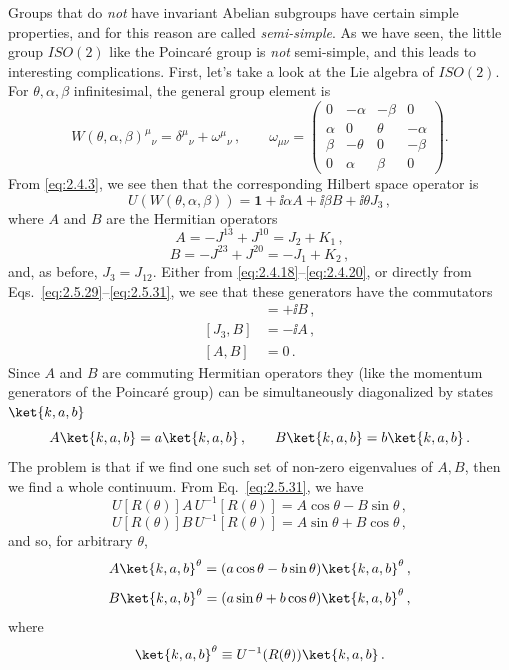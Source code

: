 Groups that do \emph{not} have invariant Abelian subgroups have certain simple
properties, and for this reason are called \emph{semi-simple}. As we have seen,
the little group $ISO(2)$ like the Poincar\'e group is \emph{not}
semi-simple, and this leads to interesting complications. First, let's take a
look at the Lie algebra of $ISO(2)$. For $\theta,\alpha,\beta$ infinitesimal,
the general group element is
\[
W(\theta,\alpha,\beta)^\mu{}_{\nu}
=\delta^\mu{}_{\nu}+\omega^\mu{}_{\nu}\,,
\qquad
\omega_{\mu\nu}=
\begin{pmatrix}
0&-\alpha&-\beta&0\\
\alpha&0&\theta&-\alpha\\
\beta&-\theta&0&-\beta\\
0&\alpha&\beta&0
\end{pmatrix}.
\]
From \eqref{eq:2.4.3}, we see then that the corresponding Hilbert space operator is
\begin{equation}
U(W(\theta,\alpha,\beta))=\mathbf{1}+\ii\alpha A+\ii\beta B+\ii\theta J_3\,,
\tag{2.5.32}\label{eq:2.5.32}
\end{equation}
where $A$ and $B$ are the Hermitian operators
\begin{equation}
A=-J^{13}+J^{10}=J_2+K_1\,,
\tag{2.5.33}\label{eq:2.5.33}
\end{equation}
\begin{equation}
B=-J^{23}+J^{20}=-J_1+K_2\,,
\tag{2.5.34}\label{eq:2.5.34}
\end{equation}
and, as before, $J_3=J_{12}$. Either from \eqref{eq:2.4.18}--\eqref{eq:2.4.20}, or directly from
Eqs.~\eqref{eq:2.5.29}--\eqref{eq:2.5.31}, we see that these generators have the commutators
\begin{align}
[J_3,A]&=+\ii B\,, \tag{2.5.35}\label{eq:2.5.35}\\
[J_3,B]&=-\ii A\,, \tag{2.5.36}\label{eq:2.5.36}\\
[A,B]&=0\,. \tag{2.5.37}\label{eq:2.5.37}
\end{align}
Since $A$ and $B$ are commuting Hermitian operators they (like the momentum
generators of the Poincar\'e group) can be simultaneously
diagonalized by states $\ket{k,a,b}$
\[
A\ket{k,a,b}=a\ket{k,a,b}\,,
\qquad
B\ket{k,a,b}=b\ket{k,a,b}\,.
\]
The problem is that if we find one such set of non-zero eigenvalues of $A,B$,
then we find a whole continuum. From Eq.~\eqref{eq:2.5.31}, we have
\[
U[R(\theta)]A\,U^{-1}[R(\theta)]=A\cos\theta-B\sin\theta\,,
\]
\[
U[R(\theta)]B\,U^{-1}[R(\theta)]=A\sin\theta+B\cos\theta\,,
\]
and so, for arbitrary $\theta$,
\[
A\ket{k,a,b}^{\theta}=(a\cos\theta-b\sin\theta)\ket{k,a,b}^{\theta}\,,
\]
\[
B\ket{k,a,b}^{\theta}=(a\sin\theta+b\cos\theta)\ket{k,a,b}^{\theta}\,,
\]
where
\[
\ket{k,a,b}^{\theta}\equiv U^{-1}(R(\theta))\ket{k,a,b}\,.
\]

